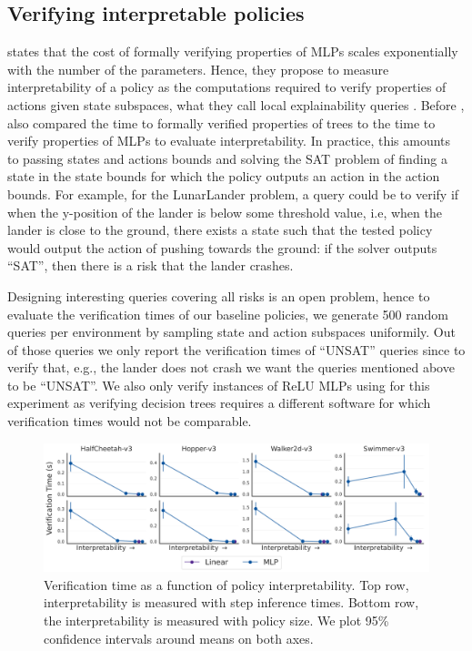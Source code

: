 \subsection{Verifying interpretable policies}
\cite{lens-complexity} states that the cost of formally verifying properties of MLPs scales exponentially with the number of the parameters.
Hence, they propose to measure interpretability of a policy as the computations required to verify properties of actions given state subspaces, what they call local explainability queries \cite{query}.
Before \cite{lens-complexity}, \cite{viper} also compared the time to formally verified properties of trees to the time to verify properties of MLPs to evaluate interpretability.
In practice, this amounts to passing states and actions bounds and solving the SAT problem of finding a state in the state bounds for which the policy outputs an action in the action bounds.
For example, for the LunarLander problem, a query could be to verify if when the y-position of the lander is below some threshold value, i.e, when the lander is close to the ground, there exists a state such that the tested policy would output the action of pushing towards the ground: if the solver outputs ``SAT'', then there is a risk that the lander crashes. 

Designing interesting queries covering all risks is an open problem, hence to evaluate the verification times of our baseline policies, we generate 500 random queries per environment by sampling state and action subspaces uniformily.
Out of those queries we only report the verification times of ``UNSAT'' queries since to verify that, e.g., the lander does not crash we want the queries mentioned above to be ``UNSAT''.
We also only verify instances of ReLU MLPs using \cite{maraboupy} for this experiment as verifying decision trees requires a different software \cite{z3} for which verification times would not be comparable.

\begin{figure}[ht]
    \centering
    \includegraphics[width=1\linewidth]{images/images_part3/verification_tradeoff.pdf}
    \caption{Verification time as a function of policy interpretability. Top row, interpretability is measured with step inference times. Bottom row, the interpretability is measured with policy size. We plot 95\% confidence intervals around means on both axes.}
    \label{fig:trade-off-verif}
\end{figure}

